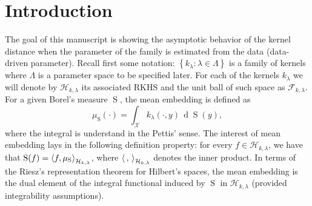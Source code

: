 \begin{abstract}

\end{abstract}

\keywords{}


\section{Introduction}\label{Sec:Intro}
	The goal of this manuscript is showing the asymptotic behavior of the kernel distance when the parameter of the family is estimated from the data (data-driven parameter). Recall first some notation: $\left\{k_{\lambda}:\lambda\in\Lambda\right\}$ is a family of kernels where $\Lambda$ is a parameter space to be specified later. For each of the kernels $k_{\lambda}$ we will denote by $\mathcal{H}_{k,\lambda}$ its associated RKHS and the unit ball of such space as $\mathcal{F}_{k,\lambda}$. For a given Borel's measure $\operatorname{S}$, the mean embedding is defined as
	\begin{equation}
		\mu_{\operatorname{S}}(\cdot)=\int_{\mathcal{X}}k_{\lambda}(\cdot,y)\,\operatorname{d}\!\operatorname{S}(y),
	\end{equation}
	where the integral is understand in the Pettis' sense. The interest of mean embedding lays in the following definition property: for every $f\in\mathcal{H}_{k,\lambda}$, we have that $\operatorname{S}(f)=\left\langle f, \mu_{\operatorname{S}}\right\rangle_{\mathcal{H}_{k,\lambda}}$, where $\left\langle \,, \,\right\rangle_{\mathcal{H}_{k,\lambda}}$ denotes the inner product. In terms of the Riesz's representation theorem for Hilbert's spaces, the mean embedding is the dual element of the integral functional induced by $\operatorname{S}$ in $\mathcal{H}_{k,\lambda}$ (provided integrability assumptions).
	
